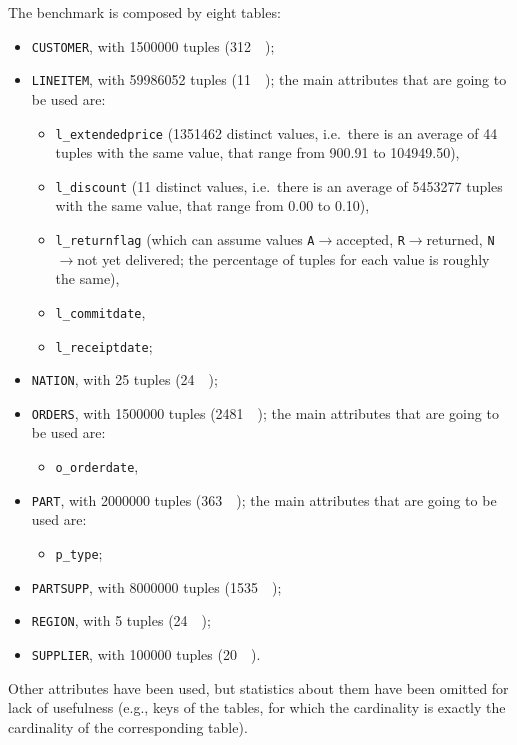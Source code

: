 The benchmark is composed by eight tables:
\begin{itemize}
	\item \texttt{CUSTOMER}, with \num{1500000} tuples (\SI{312}{\mega\byte});
	\item \texttt{LINEITEM}, with \num{59986052} tuples (\SI{11}{\giga\byte}); the main attributes that are going to be used are:
		\begin{itemize}
			\item \texttt{l\_extendedprice} (\num{1351462} distinct values, i.e.\ there is an average of \num{44} tuples with the same value, that range from \num{900.91} to \num{104949.50}),
			\item \texttt{l\_discount} (\num{11} distinct values, i.e.\ there is an average of \num{5453277} tuples with the same value, that range from \num{0.00} to \num{0.10}),
			\item \texttt{l\_returnflag} (which can assume values \texttt{A}$\rightarrow$accepted, \texttt{R}$\rightarrow$returned, \texttt{N}$\rightarrow$not yet delivered; the percentage of tuples for each value is roughly the same),
			\item \texttt{l\_commitdate},
			\item \texttt{l\_receiptdate};
		\end{itemize}
	\item \texttt{NATION}, with \num{25} tuples (\SI{24}{\kilo\byte});
	\item \texttt{ORDERS}, with \num{1500000} tuples (\SI{2481}{\kilo\byte}); the main attributes that are going to be used are:
		\begin{itemize}
			\item \texttt{o\_orderdate},
		\end{itemize}
	\item \texttt{PART}, with \num{2000000} tuples (\SI{363}{\mega\byte}); the main attributes that are going to be used are:
		\begin{itemize}
			\item \texttt{p\_type};
		\end{itemize}
	\item \texttt{PARTSUPP}, with \num{8000000} tuples (\SI{1535}{\mega\byte});
	\item \texttt{REGION}, with \num{5} tuples (\SI{24}{\kilo\byte});
	\item \texttt{SUPPLIER}, with \num{100000} tuples (\SI{20}{\mega\byte}).
\end{itemize}

Other attributes have been used, but statistics about them have been omitted for lack of usefulness (e.g., keys of the tables, for which the cardinality is exactly the cardinality of the corresponding table).